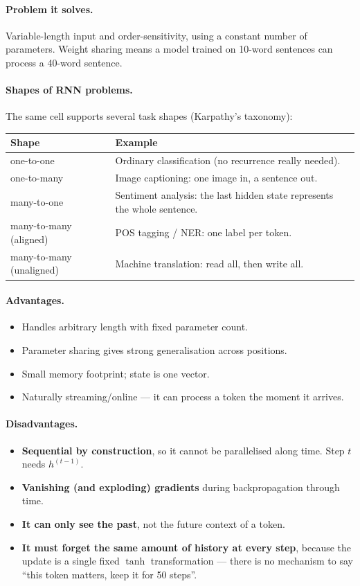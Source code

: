 \documentclass[11pt,a4paper]{article}
\begin{document}
\paragraph{Problem it solves.} Variable-length input and order-sensitivity, using a constant
number of parameters. Weight sharing means a model trained on 10-word sentences can process
a 40-word sentence.

\paragraph{Shapes of RNN problems.} The same cell supports several task shapes
(Karpathy's taxonomy):
\begin{center}
\begin{tabularx}{\textwidth}{lY}
\textbf{Shape} & \textbf{Example} \\
\hline
one-to-one & Ordinary classification (no recurrence really needed). \\
one-to-many & Image captioning: one image in, a sentence out. \\
many-to-one & Sentiment analysis: the last hidden state represents the whole sentence. \\
many-to-many (aligned) & POS tagging / NER: one label per token. \\
many-to-many (unaligned) & Machine translation: read all, then write all. \\
\end{tabularx}
\end{center}

\paragraph{Advantages.}
\begin{itemize}
\item Handles arbitrary length with fixed parameter count.
\item Parameter sharing gives strong generalisation across positions.
\item Small memory footprint; state is one vector.
\item Naturally streaming/online --- it can process a token the moment it arrives.
\end{itemize}

\paragraph{Disadvantages.}
\begin{itemize}
\item \textbf{Sequential by construction}, so it cannot be parallelised along time. Step $t$
  needs $h^{(t-1)}$.
\item \textbf{Vanishing (and exploding) gradients} during backpropagation through time.
\item \textbf{It can only see the past}, not the future context of a token.
\item \textbf{It must forget the same amount of history at every step}, because the update
  is a single fixed $\tanh$ transformation --- there is no mechanism to say ``this token
  matters, keep it for 50 steps''.
\end{itemize}
\end{document}
